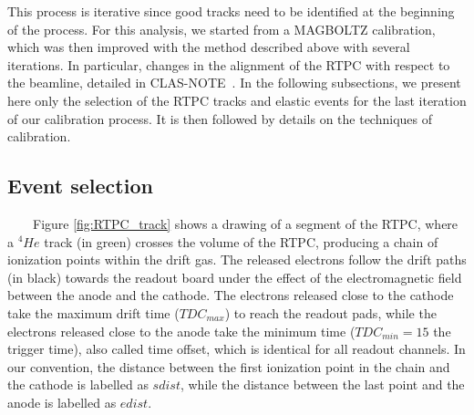 This process is iterative since good tracks need to be identified at the 
beginning of the process. For this analysis, we started from a MAGBOLTZ 
calibration, which was then improved with the method described above with 
several iterations. In particular, changes in the alignment of the RTPC with 
respect to the beamline, detailed in CLAS-NOTE~\cite{eg6beamoffset}. In the 
following subsections, we present here only the selection of the RTPC tracks 
and elastic events for the last iteration of our calibration process. It is 
then followed by details on the techniques of calibration.   

\subsection{Event selection}
~~~~Figure \ref{fig:RTPC_track} shows a drawing of a segment of the RTPC, where a $^4He$ track (in 
green) crosses the volume of the RTPC, producing a chain of ionization points 
within the drift gas. The released electrons follow the drift paths (in black) 
towards the readout board under the effect of the  electromagnetic field 
between the anode and the cathode. The electrons released close to the cathode 
take the maximum drift time ($TDC_{max}$) to reach the readout pads, while the 
electrons released close to the anode take the minimum time ($TDC_{min} = 15$ the 
trigger time), also called time offset, which is identical 
for all readout channels. In our convention, the distance between the 
first ionization point in the chain and the cathode is labelled as $sdist$, 
while the distance between the last point and the anode is labelled as 
$edist$.\\ 


